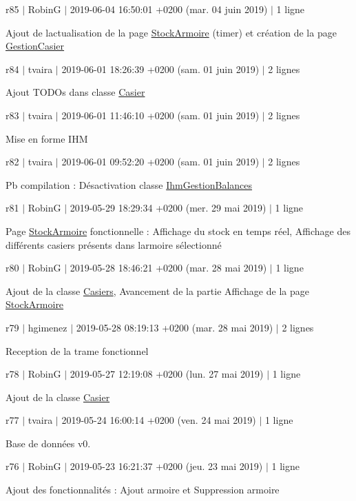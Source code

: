 r85 $\vert$ RobinG $\vert$ 2019-\/06-\/04 16\+:50\+:01 +0200 (mar. 04 juin 2019) $\vert$ 1 ligne

Ajout de l\textquotesingle{}actualisation de la page \hyperlink{class_stock_armoire}{Stock\+Armoire} (timer) et création de la page \hyperlink{class_gestion_casier}{Gestion\+Casier}

r84 $\vert$ tvaira $\vert$ 2019-\/06-\/01 18\+:26\+:39 +0200 (sam. 01 juin 2019) $\vert$ 2 lignes

Ajout T\+O\+D\+Os dans classe \hyperlink{class_casier}{Casier}

r83 $\vert$ tvaira $\vert$ 2019-\/06-\/01 11\+:46\+:10 +0200 (sam. 01 juin 2019) $\vert$ 2 lignes

Mise en forme I\+HM

r82 $\vert$ tvaira $\vert$ 2019-\/06-\/01 09\+:52\+:20 +0200 (sam. 01 juin 2019) $\vert$ 2 lignes

Pb compilation \+: Désactivation classe \hyperlink{class_ihm_gestion_balances}{Ihm\+Gestion\+Balances}

r81 $\vert$ RobinG $\vert$ 2019-\/05-\/29 18\+:29\+:34 +0200 (mer. 29 mai 2019) $\vert$ 1 ligne

Page \hyperlink{class_stock_armoire}{Stock\+Armoire} fonctionnelle \+: Affichage du stock en temps réel, Affichage des différents casiers présents dans l\textquotesingle{}armoire sélectionné

r80 $\vert$ RobinG $\vert$ 2019-\/05-\/28 18\+:46\+:21 +0200 (mar. 28 mai 2019) $\vert$ 1 ligne

Ajout de la classe \hyperlink{class_casiers}{Casiers}, Avancement de la partie Affichage de la page \hyperlink{class_stock_armoire}{Stock\+Armoire}

r79 $\vert$ hgimenez $\vert$ 2019-\/05-\/28 08\+:19\+:13 +0200 (mar. 28 mai 2019) $\vert$ 2 lignes

Reception de la trame fonctionnel

r78 $\vert$ RobinG $\vert$ 2019-\/05-\/27 12\+:19\+:08 +0200 (lun. 27 mai 2019) $\vert$ 1 ligne

Ajout de la classe \hyperlink{class_casier}{Casier}

r77 $\vert$ tvaira $\vert$ 2019-\/05-\/24 16\+:00\+:14 +0200 (ven. 24 mai 2019) $\vert$ 1 ligne

Base de données v0.

r76 $\vert$ RobinG $\vert$ 2019-\/05-\/23 16\+:21\+:37 +0200 (jeu. 23 mai 2019) $\vert$ 1 ligne

Ajout des fonctionnalités \+: Ajout armoire et Suppression armoire

